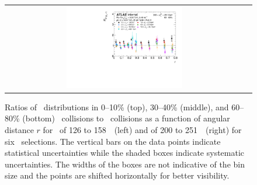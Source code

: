 \begin{figure}[h]
{\begin{tabular}{cc}
            \includegraphics[width=0.5\textwidth]{figures/results/RDpT_dR_jet9_cent5.pdf} \\
      \end{tabular}
      }
\caption{Ratios of \Dptr\ distributions in 0--10\% (top), 30--40\% (middle), and 60--80\% (bottom) \PbPb\ collisions to \pp\ collisions as a function of angular distance $r$ for \ptjet\ of 126 to 158~\GeV\ (left) and of 200 to 251~\GeV\ (right) for six \pt\ selections. The vertical bars on the data points indicate statistical uncertainties while the shaded boxes indicate systematic uncertainties. The widths of the boxes are not indicative of the bin size and the points are shifted horizontally for better visibility.}
\label{fig:rdptr}
\end{figure}




\FloatBarrier
